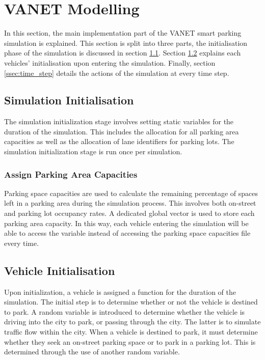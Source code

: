 \section{\ac{VANET} Modelling}
In this section, the main implementation part of the \ac{VANET} smart parking simulation is explained. This section is split into three parts, the initialisation phase of the simulation is discussed in section \ref{ssec:sim_init}. Section \ref{ssec:vehicle_init} explains each vehicles' initialisation upon entering the simulation. Finally, section \ref{ssec:time_step} details the actions of the simulation at every time step.

\subsection{Simulation Initialisation} \label{ssec:sim_init}
The simulation initialization stage involves setting static variables for the duration of the simulation. This includes the allocation for all parking area capacities as well as the allocation of lane identifiers for parking lots. The simulation initialization stage is run once per simulation.

\subsubsection{Assign Parking Area Capacities}
Parking space capacities are used to calculate the remaining percentage of spaces left in a parking area during the simulation process. This involves both on-street and parking lot occupancy rates. A dedicated global vector is used to store each parking area capacity. In this way, each vehicle entering the simulation will be able to access the variable instead of accessing the parking space capacities file every time.

\subsection{Vehicle Initialisation} \label{ssec:vehicle_init}
Upon initialization, a vehicle is assigned a function for the duration of the simulation. The initial step is to determine whether or not the vehicle is destined to park. A random variable is introduced to determine whether the vehicle is driving into the city to park, or passing through the city. The latter is to simulate traffic flow within the city. When a vehicle is destined to park, it must determine whether they seek an on-street parking space or to park in a parking lot. This is determined through the use of another random variable.

